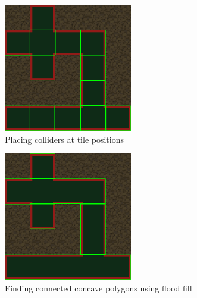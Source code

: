 \begin{figure}[H]
    \centering
    \includegraphics[width=0.5\textwidth]{figures/generating_levels/wall_with_vertices.png}
    \caption{Placing colliders at tile positions}\label{fig:wall_with_vertices} 
\end{figure}

\begin{figure}[H]
    \centering
    \includegraphics[width=0.5\textwidth]{figures/generating_levels/wall_with_convex.png}
    \caption{Finding connected concave polygons using flood fill}\label{fig:wall_with_convex} 
\end{figure}
